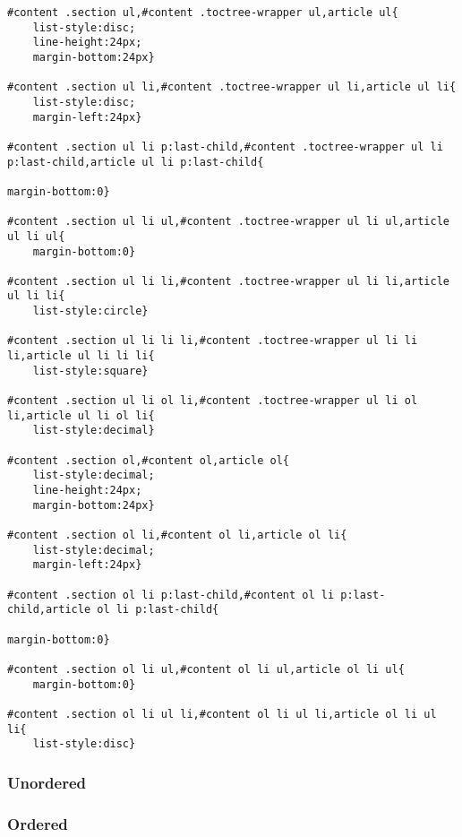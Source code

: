 \documentclass[11pt]{article}
\begin{document}
\begin{verbatim}
#content .section ul,#content .toctree-wrapper ul,article ul{
    list-style:disc;
    line-height:24px;
    margin-bottom:24px}

#content .section ul li,#content .toctree-wrapper ul li,article ul li{
    list-style:disc;
    margin-left:24px}

#content .section ul li p:last-child,#content .toctree-wrapper ul li p:last-child,article ul li p:last-child{
                                                                                                                                  margin-bottom:0}

#content .section ul li ul,#content .toctree-wrapper ul li ul,article ul li ul{
    margin-bottom:0}

#content .section ul li li,#content .toctree-wrapper ul li li,article ul li li{
    list-style:circle}

#content .section ul li li li,#content .toctree-wrapper ul li li li,article ul li li li{
    list-style:square}

#content .section ul li ol li,#content .toctree-wrapper ul li ol li,article ul li ol li{
    list-style:decimal}

#content .section ol,#content ol,article ol{
    list-style:decimal;
    line-height:24px;
    margin-bottom:24px}

#content .section ol li,#content ol li,article ol li{
    list-style:decimal;
    margin-left:24px}

#content .section ol li p:last-child,#content ol li p:last-child,article ol li p:last-child{
                                                                                                                           margin-bottom:0}

#content .section ol li ul,#content ol li ul,article ol li ul{
    margin-bottom:0}

#content .section ol li ul li,#content ol li ul li,article ol li ul li{
    list-style:disc}
\end{verbatim}

\subsubsection{Unordered}
\label{sec:org2baf44b}

\subsubsection{Ordered}
\label{sec:org9b37a78}
\end{document}
